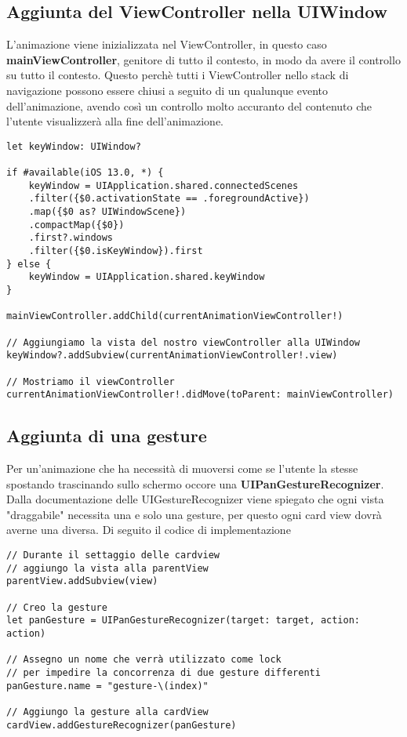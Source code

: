 \subsection{Aggiunta del ViewController nella UIWindow}

L'animazione viene inizializzata nel ViewController, in questo caso \textbf{mainViewController},
genitore di tutto il contesto, in modo da avere il controllo su tutto 
il contesto. Questo perchè tutti i ViewController nello stack di navigazione possono
essere chiusi a seguito di un qualunque evento dell'animazione, avendo così un controllo molto accuranto
del contenuto che l'utente visualizzerà alla fine dell'animazione.

\begin{verbatim}
let keyWindow: UIWindow?

if #available(iOS 13.0, *) {
    keyWindow = UIApplication.shared.connectedScenes
    .filter({$0.activationState == .foregroundActive})
    .map({$0 as? UIWindowScene})
    .compactMap({$0})
    .first?.windows
    .filter({$0.isKeyWindow}).first
} else {
    keyWindow = UIApplication.shared.keyWindow
}

mainViewController.addChild(currentAnimationViewController!)

// Aggiungiamo la vista del nostro viewController alla UIWindow
keyWindow?.addSubview(currentAnimationViewController!.view)

// Mostriamo il viewController
currentAnimationViewController!.didMove(toParent: mainViewController)
\end{verbatim}

\subsection{Aggiunta di una gesture}\label{gestureimplemention}

Per un'animazione che ha necessità di muoversi come se l'utente la stesse spostando trascinando sullo schermo occore una \textbf{UIPanGestureRecognizer}.
Dalla documentazione delle UIGestureRecognizer viene spiegato che ogni vista "draggabile" necessita una  e solo una gesture,
per questo ogni card view dovrà averne una diversa. Di seguito il codice di implementazione

\begin{verbatim}
// Durante il settaggio delle cardview
// aggiungo la vista alla parentView
parentView.addSubview(view)

// Creo la gesture
let panGesture = UIPanGestureRecognizer(target: target, action: action)

// Assegno un nome che verrà utilizzato come lock
// per impedire la concorrenza di due gesture differenti
panGesture.name = "gesture-\(index)"

// Aggiungo la gesture alla cardView
cardView.addGestureRecognizer(panGesture)
\end{verbatim}

